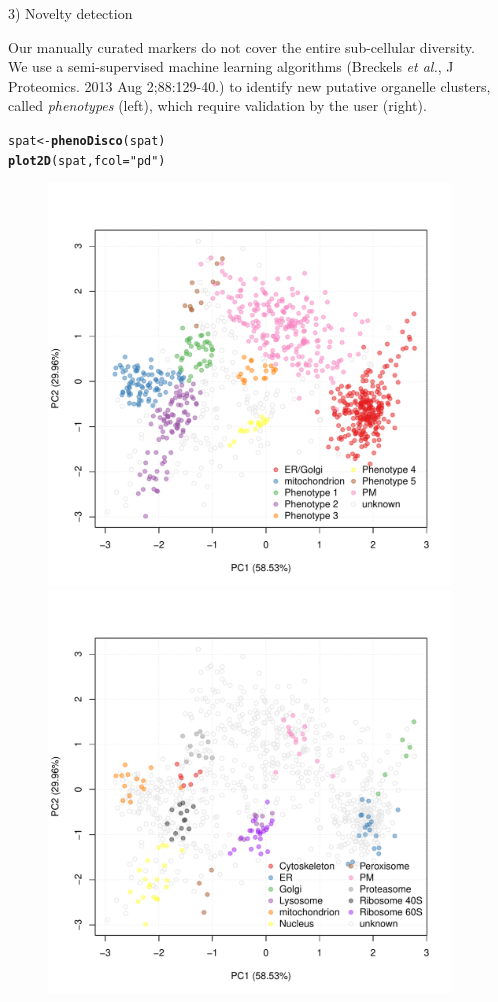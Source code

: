 \documentclass[final]{beamer}\usepackage[]{graphicx}\usepackage[]{color}
\makeatletter
\newcommand{\hlstr}[1]{\textcolor[rgb]{0.192,0.494,0.8}{#1}}%
\newcommand{\hlstd}[1]{\textcolor[rgb]{0.345,0.345,0.345}{#1}}%
\newcommand{\hlkwb}[1]{\textcolor[rgb]{0.69,0.353,0.396}{#1}}%
\newcommand{\hlkwc}[1]{\textcolor[rgb]{0.333,0.667,0.333}{#1}}%
\newcommand{\hlkwd}[1]{\textcolor[rgb]{0.737,0.353,0.396}{\textbf{#1}}}%
\newenvironment{kframe}{%
 \def\at@end@of@kframe{}%
 \ifinner\ifhmode%
  \def\at@end@of@kframe{\end{minipage}}%
  \begin{minipage}{\columnwidth}%
 \fi\fi%
 \def\FrameCommand##1{\hskip\@totalleftmargin \hskip-\fboxsep
 \colorbox{shadecolor}{##1}\hskip-\fboxsep
     \hskip-\linewidth \hskip-\@totalleftmargin \hskip\columnwidth}%
 \MakeFramed {\advance\hsize-\width
   \@totalleftmargin\z@ \linewidth\hsize
   \@setminipage}}%
 {\par\unskip\endMakeFramed%
 \at@end@of@kframe}
\newenvironment{knitrout}{}{} %
\makeatother
\begin{document}
\begin{frame}[fragile]
\begin{columns}
\begin{column}{.48\textwidth}
    \end{column}

    \begin{column}{.48\textwidth}  

      \begin{block}{3) Novelty detection}
        
        Our manually curated markers do not cover the entire
        sub-cellular diversity. We use a semi-supervised machine
        learning algorithms (Breckels \textit{et al.}, J
        Proteomics. 2013 Aug 2;88:129-40.) to identify new putative
        organelle clusters, called \emph{phenotypes} (left), which
        require validation by the user (right).

\begin{knitrout}
\color{fgcolor}\begin{kframe}
\begin{alltt}
\hlstd{spat} \hlkwb{<-} \hlkwd{phenoDisco}\hlstd{(spat)}
\hlkwd{plot2D}\hlstd{(spat,} \hlkwc{fcol} \hlstd{=} \hlstr{"pd"}\hlstd{)}
\end{alltt}
\end{kframe}
\end{knitrout}

      \begin{figure}
        \centering
        \includegraphics[width=.41\linewidth]{./figures/pca3.pdf}
        \includegraphics[width=.41\linewidth]{./figures/pca4.pdf}
      \end{figure}


\end{block}
\end{column}
\end{columns}
\end{frame}
\end{document}
